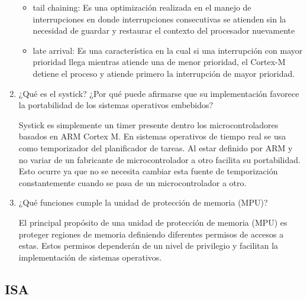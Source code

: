 \documentclass[12pt, a4paper]{article}
\makeatletter
\newcommand\setItemnumber[1]{\setcounter{enum\romannumeral\@enumdepth}{\numexpr#1-1\relax}}
\makeatother
\begin{document}
\begin{enumerate}
    \begin{itemize}
        \item tail chaining: Es una optimización realizada en el manejo de interrupciones en donde 
        interrupciones consecutivas se atienden sin la necesidad de guardar y restaurar el contexto del 
        procesador nuevamente  
        
        \item late arrival: Es una característica en la cual si una interrupción con mayor prioridad llega 
        mientras atiende una de menor prioridad, el Cortex-M detiene el proceso y atiende primero la 
        interrupción de mayor prioridad.
    \end{itemize}
    
    
    \setItemnumber{17}
    \item ¿Qué es el systick? ¿Por qué puede afirmarse que su implementación favorece la portabilidad 
    de los sistemas operativos embebidos?
    
    Systick es simplemente un timer presente dentro los microcontroladores basados en ARM Cortex M. 
    En sistemas operativos de tiempo real se usa como temporizador del planificador de tareas. Al estar
    definido por ARM y no variar de un fabricante de microcontrolador a otro facilita
    su portabilidad. Esto ocurre ya que no se necesita cambiar esta fuente de temporización 
    constantemente cuando se pasa de un microcontrolador a otro.
    
    \setItemnumber{18}
    \item ¿Qué funciones cumple la unidad de protección de memoria (MPU)?
    
    El principal propósito de una unidad de protección de memoria (MPU) es proteger regiones de
    memoria definiendo diferentes permisos de accesos a estas. Estos permisos dependerán de un 
    nivel de privilegio y facilitan la implementación de sistemas operativos.
    
\end{enumerate}

\subsection{ISA}
\end{document}
